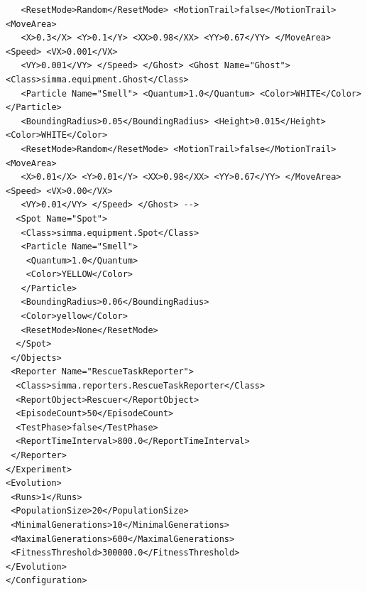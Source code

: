 \documentclass[12pt,fleqn,a4paper]{article}
\begin{document}
\begin{lstlisting}
   <ResetMode>Random</ResetMode> <MotionTrail>false</MotionTrail> <MoveArea>
   <X>0.3</X> <Y>0.1</Y> <XX>0.98</XX> <YY>0.67</YY> </MoveArea> <Speed> <VX>0.001</VX>
   <VY>0.001</VY> </Speed> </Ghost> <Ghost Name="Ghost"> <Class>simma.equipment.Ghost</Class>
   <Particle Name="Smell"> <Quantum>1.0</Quantum> <Color>WHITE</Color> </Particle>
   <BoundingRadius>0.05</BoundingRadius> <Height>0.015</Height> <Color>WHITE</Color>
   <ResetMode>Random</ResetMode> <MotionTrail>false</MotionTrail> <MoveArea>
   <X>0.01</X> <Y>0.01</Y> <XX>0.98</XX> <YY>0.67</YY> </MoveArea> <Speed> <VX>0.00</VX>
   <VY>0.01</VY> </Speed> </Ghost> -->
  <Spot Name="Spot">
   <Class>simma.equipment.Spot</Class>
   <Particle Name="Smell">
    <Quantum>1.0</Quantum>
    <Color>YELLOW</Color>
   </Particle>
   <BoundingRadius>0.06</BoundingRadius>
   <Color>yellow</Color>
   <ResetMode>None</ResetMode>
  </Spot>
 </Objects>
 <Reporter Name="RescueTaskReporter">
  <Class>simma.reporters.RescueTaskReporter</Class>
  <ReportObject>Rescuer</ReportObject>
  <EpisodeCount>50</EpisodeCount>
  <TestPhase>false</TestPhase>
  <ReportTimeInterval>800.0</ReportTimeInterval>
 </Reporter>
</Experiment>
<Evolution>
 <Runs>1</Runs>
 <PopulationSize>20</PopulationSize>
 <MinimalGenerations>10</MinimalGenerations>
 <MaximalGenerations>600</MaximalGenerations>
 <FitnessThreshold>300000.0</FitnessThreshold>
</Evolution>
</Configuration>
\end{lstlisting}

%
%
\end{document}
